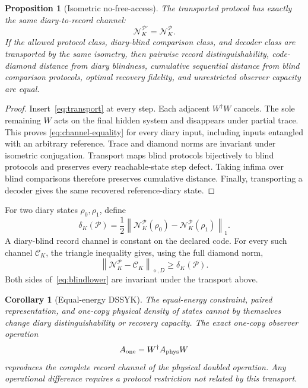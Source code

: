 \documentclass[11pt]{article}
\newtheorem{proposition}{Proposition}
\newtheorem{corollary}{Corollary}
\newcommand{\cC}{\mathcal C}
\newcommand{\cN}{\mathcal N}
\newcommand{\cP}{\mathcal P}
\begin{document}
\begin{proposition}[Isometric no-free-access]
\label{prop:isometry}
The transported protocol has exactly the same diary-to-record channel:
\begin{equation}
  \cN_K^{\cP'}=\cN_K^{\cP}.
  \label{eq:channel-equality}
\end{equation}
If the allowed protocol class, diary-blind comparison class, and decoder class
are transported by the same isometry, then pairwise record
distinguishability, code-diamond distance from diary blindness, cumulative
sequential distance from blind comparison protocols, optimal recovery
fidelity, and unrestricted observer capacity are equal.
\end{proposition}

\begin{proof}
Insert~\eqref{eq:transport} at every step.  Each adjacent
$W^\dagger W$ cancels.  The sole remaining $W$ acts on the final hidden system
and disappears under partial trace.  This proves
\eqref{eq:channel-equality} for every diary input, including inputs entangled
with an arbitrary reference.  Trace and diamond norms are invariant under
isometric conjugation.  Transport maps blind protocols bijectively to blind
protocols and preserves every reachable-state step defect.  Taking infima
over blind comparisons therefore preserves cumulative distance.  Finally,
transporting a decoder gives the same recovered reference-diary state.
\end{proof}

For two diary states $\rho_0,\rho_1$, define
\begin{equation}
  \delta_K(\cP)
  =\frac12\left\|
    \cN_K^{\cP}(\rho_0)-\cN_K^{\cP}(\rho_1)
  \right\|_1.
  \label{eq:delta}
\end{equation}
A diary-blind record channel is constant on the declared code.  For every such
channel $\cC_K$, the triangle inequality gives, using the full diamond norm,
\begin{equation}
  \left\|\cN_K^{\cP}-\cC_K\right\|_{\diamond,D}
  \geq \delta_K(\cP).
  \label{eq:blindlower}
\end{equation}
Both sides of~\eqref{eq:blindlower} are invariant under the transport above.

\begin{corollary}[Equal-energy DSSYK]
\label{cor:dssyk}
The equal-energy constraint, paired representation, and one-copy physical
density of states cannot by themselves change diary distinguishability or
recovery capacity.  The exact one-copy observer operation
\begin{equation}
  A_{\rm one}=W^\dagger A_{\rm phys}W
  \label{eq:operatortransport}
\end{equation}
reproduces the complete record channel of the physical doubled operation.
Any operational difference requires a protocol restriction not related by
this transport.
\end{corollary}
\end{document}
